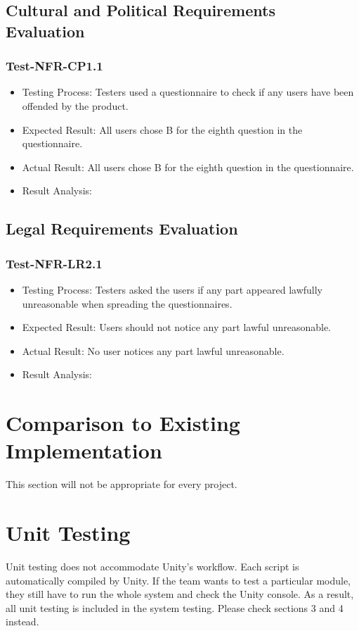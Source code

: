 \documentclass[12pt, titlepage]{article}
\begin{document}
\subsection{Cultural and Political Requirements Evaluation}
\subsubsection{Test-NFR-CP1.1}
\begin{itemize}
    \item Testing Process: Testers used a questionnaire to check if any users have been offended by the product.
    \item Expected Result: All users chose B for the eighth question in the questionnaire.
    \item Actual Result: All users chose B for the eighth question in the questionnaire.
    \item Result Analysis: \pass
\end{itemize}

\subsection{Legal Requirements Evaluation}
\subsubsection{Test-NFR-LR2.1}
\begin{itemize}
    \item Testing Process: Testers asked the users if any part appeared lawfully unreasonable when spreading the questionnaires.
    \item Expected Result: Users should not notice any part lawful unreasonable.
    \item Actual Result: No user notices any part lawful unreasonable.
    \item Result Analysis: \pass
\end{itemize}


\newpage
	
\section{Comparison to Existing Implementation}	
This section will not be appropriate for every project.

\section{Unit Testing}
Unit testing does not accommodate Unity's workflow. Each script is automatically compiled by Unity. If the team wants to test a particular module, they still have to run the whole system and check the Unity console. As a result, all unit testing is included in the system testing. Please check sections 3 and 4 instead.
\end{document}
